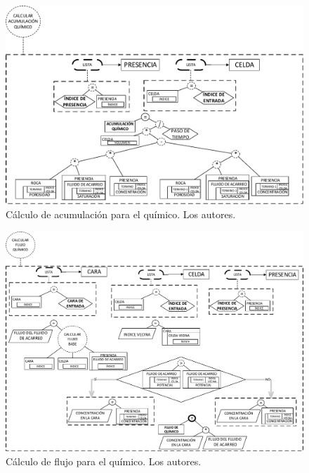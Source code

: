 \begin{figure}[h]
	\centering%
	\includegraphics[width=0.7\linewidth]{Fig/CalcularAcumulacionQuimico.pdf}%
	\caption[Cálculo de acumulación para el químico.]{Cálculo de acumulación para el químico. Los autores.} \label{fig:ChemicalAccumulation}
\end{figure}

\begin{figure}[h]
	\centering%
	\includegraphics[width=0.9\linewidth]{Fig/CalcularFlujoQuimico.pdf}%
	\caption[Cálculo de flujo para el químico.]{Cálculo de flujo para el químico. Los autores.} \label{fig:ChemicalFlow}
\end{figure}

